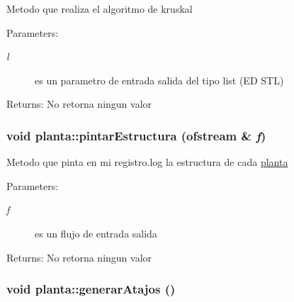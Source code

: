 Metodo que realiza el algoritmo de kruskal \begin{Desc}
\item[Parameters:]
\begin{description}
\item[{\em l}]es un parametro de entrada salida del tipo list (ED STL) \end{description}
\end{Desc}
\begin{Desc}
\item[Returns:]No retorna ningun valor \end{Desc}
\hypertarget{classplanta_b4ffd08f4b41a91e0f1ad667e2e9014f}{
\subsubsection[pintarEstructura]{\setlength{\rightskip}{0pt plus 5cm}void planta::pintarEstructura (ofstream \& {\em f})}}
\label{classplanta_b4ffd08f4b41a91e0f1ad667e2e9014f}


Metodo que pinta en mi registro.log la estructura de cada \hyperlink{classplanta}{planta} \begin{Desc}
\item[Parameters:]
\begin{description}
\item[{\em f}]es un flujo de entrada salida \end{description}
\end{Desc}
\begin{Desc}
\item[Returns:]No retorna ningun valor \end{Desc}
\hypertarget{classplanta_d9f49ae6d392d9f7de7320140c87b285}{
\subsubsection[generarAtajos]{\setlength{\rightskip}{0pt plus 5cm}void planta::generarAtajos ()}}
\label{classplanta_d9f49ae6d392d9f7de7320140c87b285}


